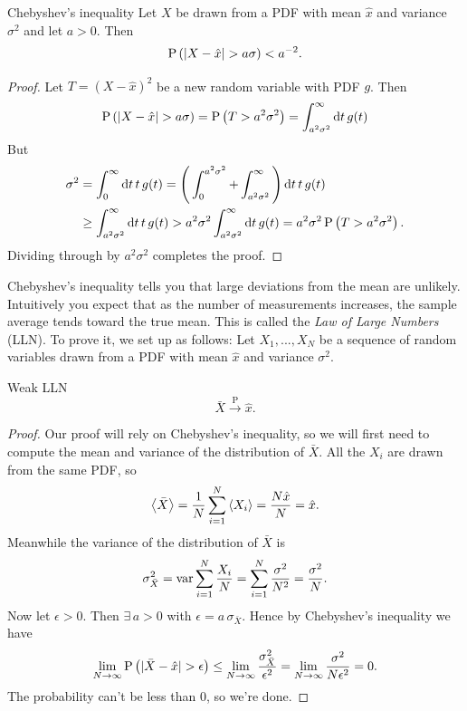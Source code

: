 \begin{theorem}{Chebyshev's inequality}{}
  Let $X$ be drawn from a PDF with mean $\hat{x}$ and variance
  $\sigma^2$ and let $a>0$. Then
  \begin{equation*}
    \pr{|X-\hat{x}|>a\sigma}<a^{-2}.
  \end{equation*}
  \begin{proof}
    Let $T=(X-\hat{x})^2$ be a new random variable with PDF $g$. Then
    \begin{equation*}
      \pr{|X-\hat{x}|>a\sigma}=\pr{T>a^2\sigma^2}
                              =\int_{a^2\sigma^2}^\infty\dd{t}g(t)
    \end{equation*}
    But
    \begin{equation*}
      \begin{aligned}
        \sigma^2&=\int_{0}^\infty\dd{t}t\,g(t)
                =\Bigg(\int_0^{a^2\sigma^2}
                     +\int_{a^2\sigma^2}^\infty\Bigg)\dd{t}t\,g(t)\\
                &\geq\int_{a^2\sigma^2}^\infty\dd{t}t\,g(t)
                >a^2\sigma^2\int_{a^2\sigma^2}^\infty\dd{t}g(t)
                =a^2\sigma^2\operatorname{P}\left(T>a^2\sigma^2\right).
      \end{aligned}
    \end{equation*}
   Dividing through by $a^2\sigma^2$ completes the proof.
  \end{proof} 
\end{theorem}
Chebyshev's inequality tells you that large deviations from the mean are
unlikely. Intuitively you expect that as the number of measurements
increases, the sample average tends toward the true mean. This is
called the {\it Law of Large Numbers}
(LLN). To prove it, we set up as follows: Let $X_1,...,X_N$ be a sequence 
of random variables drawn from a PDF
with mean $\hat{x}$ and variance $\sigma^2$.
\begin{theorem}{Weak LLN}{}
  $$
    \bar{X}\xrightarrow{\text{P}}\hat{x}.
  $$
  \begin{proof} Our proof will rely on Chebyshev's inequality, so we will
    first need to compute the mean and variance of the distribution of
    $\bar{X}$. All the $X_i$ are drawn from the same PDF, so
    $$
      \ev{\bar{X}}=\frac{1}{N}\sum_{i=1}^N\ev{X_i}
                  =\frac{N\hat{x}}{N}=\hat{x}.
    $$
    Meanwhile the variance of the distribution of $\bar{X}$ is
    $$
      \sigma^2_{\bar{X}}
      =\operatorname{var}\sum_{i=1}^N \frac{X_i}{N}
      =\sum_{i=1}^N\frac{\sigma^2}{N^2}
      =\frac{\sigma^2}{N}.
    $$
    Now let $\epsilon>0$. Then $\exists\,a>0$ with 
    $\epsilon=a\,\sigma_{\bar{X}}$. Hence by Chebyshev's
    inequality we have
    $$
      \lim_{N\to\infty}\pr{|\bar{X}-\hat{x}|>\epsilon}
       \leq\lim_{N\to\infty}\frac{\sigma^2_{\bar{X}}}{\epsilon^2}
       =\lim_{N\to\infty}\frac{\sigma^2}{N\epsilon^2}=0.
    $$
    The probability can't be less than 0, so we're done.
  \end{proof}
\end{theorem}
